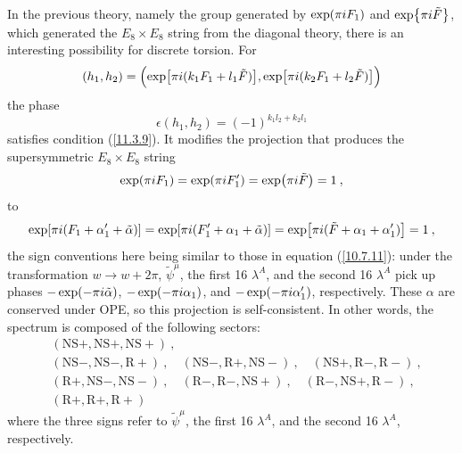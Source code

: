 In the previous theory, namely the group generated by $\exp(\pi i F_{1})$ and $\exp{\pi i\tilde{F}}$, which generated the $E_{8}\times E_{8}$ string from the diagonal theory, there is an interesting possibility for discrete torsion. For
\begin{equation}
	(h_{1},h_{2})= \Bigl(\exp[\pi i(k_{1}F_{1}+l_{1}\tilde{F})],
	\exp[\pi i(k_{2}F_{1}+l_{2}\tilde{F})]\Bigr) \label{11.3.12} 
\end{equation}
the phase
\begin{equation}
	\epsilon(h_{1},h_{2})= (-1)^{k_{1}l_{2}+k_{2}l_{1}} \label{11.3.13}
\end{equation}
satisfies condition (\ref{11.3.9}). It modifies the projection that produces the supersymmetric $E_{8}\times E_{8}$ string
\begin{equation}
	\exp(\pi i F_{1})=\exp(\pi i F_{1}^{\prime}) = \exp(\pi i\tilde{F})=1\:, \label{11.3.14}
\end{equation}
to
\begin{equation}
	\exp[\pi i (F_{1}+\alpha_{1}^{\prime}+\tilde{\alpha})]
	=\exp[\pi i(F_{1}^{\prime}+\alpha_{1}+\tilde{\alpha})] 
	= \exp[\pi i(\tilde{F}+\alpha_{1}+\alpha_{1}^{\prime})]=1\:, \label{11.3.15}
\end{equation}
the sign conventions here being similar to those in equation (\ref{10.7.11}): under the transformation $w\to w+2\pi$, $\tilde{\psi}^{\mu}$, the first 16 $\lambda^{A}$, and the second 16 $\lambda^{A}$ pick up phases $-\exp(-\pi i\tilde{\alpha})$, $-\exp(-\pi i\alpha_{1})$, and $-\exp(-\pi i\alpha_{1}^{\prime})$, respectively. These $\alpha$ are conserved under OPE, so this projection is self-consistent. In other words, the spectrum is composed of the following sectors:
\begin{align*}
	&(\mathrm{NS}+,\mathrm{NS}+,\mathrm{NS}+) \:, \\
	&(\mathrm{NS}-,\mathrm{NS}-,\mathrm{R}+)\:,\quad (\mathrm{NS}-,\mathrm{R}+,\mathrm{NS}-)\:,\quad
	(\mathrm{NS}+,\mathrm{R}-,\mathrm{R}-)\:, \\
	&(\mathrm{R}+,\mathrm{NS}-,\mathrm{NS}-)\:,\quad (\mathrm{R}-,\mathrm{R}-,\mathrm{NS}+)\:, \quad
	(\mathrm{R}-,\mathrm{NS}+,\mathrm{R}-) \:, \\
	&(\mathrm{R}+,\mathrm{R}+,\mathrm{R}+) 
\end{align*}
where the three signs refer to $\tilde{\psi}^{\mu}$, the first 16 $\lambda^{A}$, and the second 16 $\lambda^{A}$, respectively.
